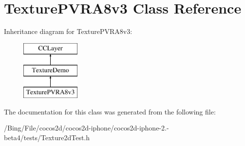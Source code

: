 \hypertarget{interface_texture_p_v_r_a8v3}{\section{Texture\-P\-V\-R\-A8v3 Class Reference}
\label{interface_texture_p_v_r_a8v3}
}
Inheritance diagram for Texture\-P\-V\-R\-A8v3\-:\begin{figure}[H]
\begin{center}
\leavevmode
\includegraphics[height=3.000000cm]{interface_texture_p_v_r_a8v3}
\end{center}
\end{figure}


The documentation for this class was generated from the following file\-:\begin{DoxyCompactItemize}
\item 
/\-Bing/\-File/cocos2d/cocos2d-\/iphone/cocos2d-\/iphone-\/2.-\/beta4/tests/Texture2d\-Test.\-h\end{DoxyCompactItemize}
